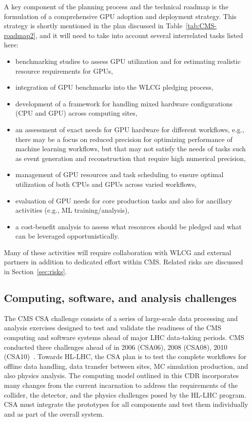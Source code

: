 A key component of the planning process and the technical roadmap is the formulation of a comprehensive \gls{GPU} adoption and deployment strategy. This strategy is shortly mentioned in the plan discussed in Table~\ref{tab:CMS-roadmap2}, and it will need to take into account several interrelated tasks listed here: 
\begin{itemize}
\item benchmarking studies to assess \gls{GPU} utilization and for estimating realistic resource requirements for \glspl{GPU},
\item integration of \gls{GPU} benchmarks into the \gls{WLCG} pledging process,
\item development of a framework for handling mixed hardware configurations (\gls{CPU} and \gls{GPU}) across computing sites, 
\item an assessment of exact needs for \gls{GPU} hardware for different workflows, e.g., there may be a focus on reduced precision for optimizing performance of machine learning workflows, but that may not satisfy the needs of tasks such as event generation and reconstruction that require high numerical precision,
\item management of \gls{GPU} resources and task scheduling to ensure optimal utilization of both \glspl{CPU} and \glspl{GPU} across varied workflows, 
\item evaluation of \gls{GPU} needs for core production tasks and also for ancillary activities (e.g., ML training/analysis),
\item a cost-benefit analysis to assess what resources should be pledged and what can be leveraged opportunistically. 
\end{itemize}
Many of these activities will require collaboration with WLCG and external partners in addition to dedicated effort within CMS. Related risks are discussed in Section~\ref{sec:risks}.

\subsection{Computing, software, and analysis challenges}

The CMS \gls{CSA} challenge consists of a series of large-scale data processing and analysis exercises designed to test and validate the readiness of the CMS computing and software systems ahead of major LHC data-taking periods. CMS conducted three challenges ahead of \RunOne in 2006 (CSA06), 2008 (CSA08), 2010 (CSA10)~\cite{2009:csa}. Towards HL-LHC, the \gls{CSA} plan is to test the complete workflows for offline data handling, data transfer between sites, \gls{MC} simulation production, and also physics analysis. The computing model outlined in this \gls{CDR} incorporates many changes from the current incarnation to address the requirements of the collider, the detector, and the physics challenges posed by the \gls{HL-LHC} program. \gls{CSA} must integrate the prototypes for all components and test them individually and as part of the overall system. 

